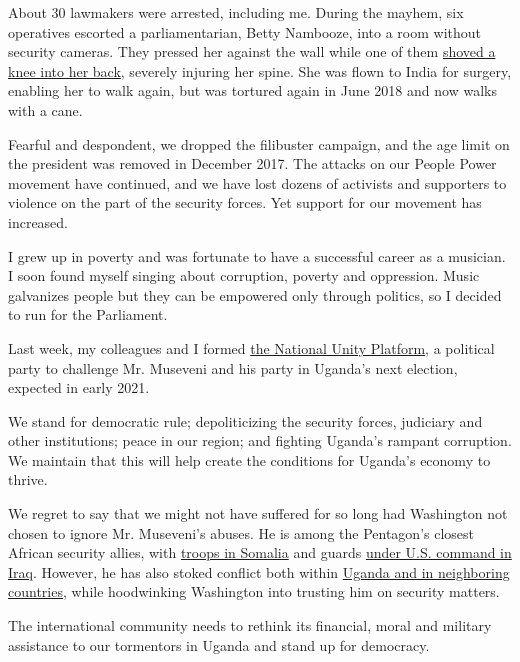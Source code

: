 About 30 lawmakers were arrested, including me. During the mayhem, six
operatives escorted a parliamentarian, Betty Nambooze, into a room
without security cameras. They pressed her against the wall while one of
them
\href{https://www.thenation.com/article/archive/us-turns-blind-eye-ugandas-assault-democracy/}{shoved
a knee into her back}, severely injuring her spine. She was flown to
India for surgery, enabling her to walk again, but was tortured again in
June 2018 and now walks with a cane.

Fearful and despondent, we dropped the filibuster campaign, and the age
limit on the president was removed in December 2017. The attacks on our
People Power movement have continued, and we have lost dozens of
activists and supporters to violence on the part of the security forces.
Yet support for our movement has increased.

I grew up in poverty and was fortunate to have a successful career as a
musician. I soon found myself singing about corruption, poverty and
oppression. Music galvanizes people but they can be empowered only
through politics, so I decided to run for the Parliament.

Last week, my colleagues and I formed
\href{https://www.nytimes.com/aponline/2020/07/22/world/africa/ap-af-uganda-bobi-wine.html}{the
National Unity Platform}, a political party to challenge Mr. Museveni
and his party in Uganda's next election, expected in early 2021.

We stand for democratic rule; depoliticizing the security forces,
judiciary and other institutions; peace in our region; and fighting
Uganda's rampant corruption. We maintain that this will help create the
conditions for Uganda's economy to thrive.

We regret to say that we might not have suffered for so long had
Washington not chosen to ignore Mr. Museveni's abuses. He is among the
Pentagon's closest African security allies, with
\href{https://www.amazon.com/dp/B074CY9SZN/ref=dp-kindle-redirect?_encoding=UTF8\&btkr=1\#customerReviews}{troops
in Somalia} and guards
\href{https://theintercept.com/2016/02/22/wounded-in-iraq-ugandan-contractors-fight-for-compensation-in-america/}{under
U.S. command in Iraq}. However, he has also stoked conflict both within
\href{https://www.dw.com/en/ugandas-double-game-in-south-sudan-civil-war-revealed/a-46500925}{Uganda
and in neighboring countries}, while hoodwinking Washington into
trusting him on security matters.

The international community needs to rethink its financial, moral and
military assistance to our tormentors in Uganda and stand up for
democracy.

